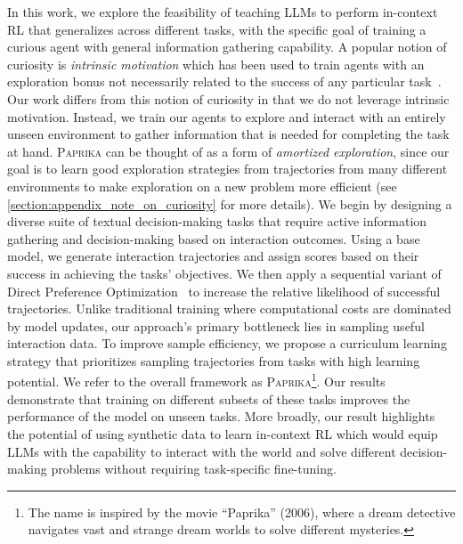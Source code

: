 \documentclass{article}
\newcommand{\ours}[1]{\textsc{Paprika}}
\theoremstyle{plain}
\theoremstyle{definition}
\theoremstyle{remark}
\begin{document}
In this work, we explore the feasibility of teaching LLMs to perform in-context RL that generalizes across different tasks, with the specific goal of training a curious agent with general information gathering capability.
A popular notion of curiosity is \emph{intrinsic motivation} which has been used to train agents with an exploration bonus not necessarily related to the success of any particular task~\citep{schmidhuber1991curious, schmidhuber2007godel}. Our work differs from this notion of curiosity in that we do not leverage intrinsic motivation. Instead, we train our agents to explore and interact with an entirely unseen environment to gather information that is needed for completing the task at hand. \ours{} can be thought of as a form of \emph{amortized exploration}, since our goal is to learn good exploration strategies from trajectories from many different environments to make exploration on a new problem more efficient (see \cref{section:appendix_note_on_curiosity} for more details).
We begin by designing a diverse suite of textual decision-making tasks that require active information gathering and decision-making based on interaction outcomes.
Using a base model, we generate interaction trajectories and assign scores based on their success in achieving the tasks' objectives.
We then apply a sequential variant of Direct Preference Optimization~\citep[DPO]{rafailov2024direct} to increase the relative likelihood of successful trajectories.
Unlike traditional training where computational costs are dominated by model updates, our approach's primary bottleneck lies in sampling useful interaction data. To improve sample efficiency, we propose a curriculum learning strategy that prioritizes sampling trajectories from tasks with high learning potential.
We refer to the overall framework as \ours{}\footnote{The name is inspired by the movie ``Paprika'' (2006), where a dream detective navigates vast and strange dream worlds to solve different mysteries.}.
Our results demonstrate that training on different subsets of these tasks improves the performance of the model on unseen tasks. More broadly, our result highlights the potential of using synthetic data to learn in-context RL which would equip LLMs with the capability to interact with the world and solve different decision-making problems without requiring task-specific fine-tuning.
\end{document}
